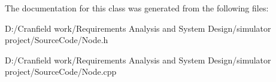 The documentation for this class was generated from the following files\+:\begin{DoxyCompactItemize}
\item 
D\+:/\+Cranfield work/\+Requirements Analysis and System Design/simulator project/\+Source\+Code/Node.\+h\item 
D\+:/\+Cranfield work/\+Requirements Analysis and System Design/simulator project/\+Source\+Code/Node.\+cpp\end{DoxyCompactItemize}
